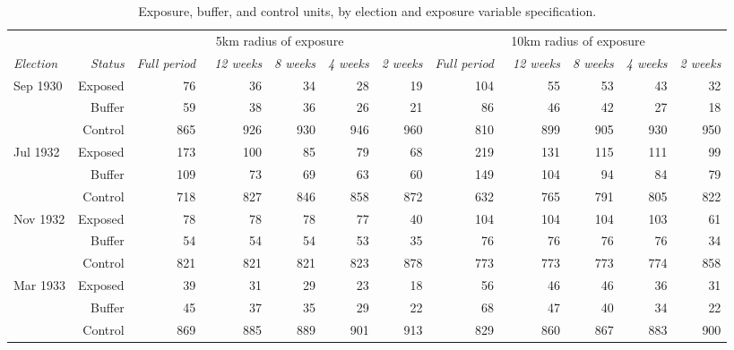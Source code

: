 \begin{table}[h!]
\centering
\caption{Exposure, buffer, and control units, by election and exposure variable specification.\label{tab:treatmentvars}} 
\begingroup\scriptsize
\begin{tabular}{lrrrrrrrrrrr}
  \toprule
   & & \multicolumn{5}{c}{5km radius of exposure} &  \multicolumn{5}{c}{10km radius of exposure}\\\cmidrule(r){3-7} \cmidrule(r){8-12}\textit{Election} & \textit{Status} & \textit{Full period} & \ \textit{12 weeks} & \textit{8 weeks} & \textit{4 weeks} & \textit{2 weeks} & \textit{Full period} & \ \textit{12 weeks} & \textit{8 weeks} & \textit{4 weeks} & \textit{2 weeks}\\ \midrule
\multirow{3}{*}{Sep 1930} & Exposed & 76 & 36 & 34 & 28 & 19 & 104 & 55 & 53 & 43 & 32 \\ 
   & Buffer & 59 & 38 & 36 & 26 & 21 & 86 & 46 & 42 & 27 & 18 \\ 
   & Control & 865 & 926 & 930 & 946 & 960 & 810 & 899 & 905 & 930 & 950 \\ 
   \midrule
\multirow{3}{*}{Jul 1932} & Exposed & 173 & 100 & 85 & 79 & 68 & 219 & 131 & 115 & 111 & 99 \\ 
   & Buffer & 109 & 73 & 69 & 63 & 60 & 149 & 104 & 94 & 84 & 79 \\ 
   & Control & 718 & 827 & 846 & 858 & 872 & 632 & 765 & 791 & 805 & 822 \\ 
   \midrule
\multirow{3}{*}{Nov 1932} & Exposed & 78 & 78 & 78 & 77 & 40 & 104 & 104 & 104 & 103 & 61 \\ 
   & Buffer & 54 & 54 & 54 & 53 & 35 & 76 & 76 & 76 & 76 & 34 \\ 
   & Control & 821 & 821 & 821 & 823 & 878 & 773 & 773 & 773 & 774 & 858 \\ 
   \midrule
\multirow{3}{*}{Mar 1933} & Exposed & 39 & 31 & 29 & 23 & 18 & 56 & 46 & 46 & 36 & 31 \\ 
   & Buffer & 45 & 37 & 35 & 29 & 22 & 68 & 47 & 40 & 34 & 22 \\ 
   & Control & 869 & 885 & 889 & 901 & 913 & 829 & 860 & 867 & 883 & 900 \\ 
   \bottomrule
\end{tabular}
\endgroup
\end{table}
